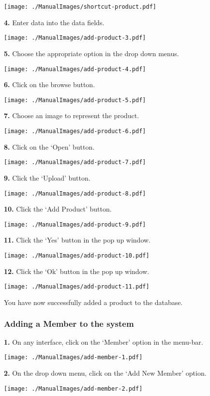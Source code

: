\texttt{[image: ./ManualImages/shortcut-product.pdf]}

\textbf{4. }Enter data into the data fields.

\texttt{[image: ./ManualImages/add-product-3.pdf]}

\textbf{5.} Choose the appropriate option in the drop down menus.

\texttt{[image: ./ManualImages/add-product-4.pdf]}

\textbf{6.} Click on the browse button.

\texttt{[image: ./ManualImages/add-product-5.pdf]}

\textbf{7.} Choose an image to represent the product.

\texttt{[image: ./ManualImages/add-product-6.pdf]}

\textbf{8.} Click on the `Open' button.

\texttt{[image: ./ManualImages/add-product-7.pdf]}

\textbf{9.} Click the `Upload' button.

\texttt{[image: ./ManualImages/add-product-8.pdf]}

\textbf{10.} Click the `Add Product' button.

\texttt{[image: ./ManualImages/add-product-9.pdf]}

\textbf{11.} Click the `Yes' button in the pop up window.

\texttt{[image: ./ManualImages/add-product-10.pdf]}

\textbf{12.} Click the `Ok' button in the pop up window.

\texttt{[image: ./ManualImages/add-product-11.pdf]}

You have now successfully added a product to the database.

\pagebreak
\subsubsection{Adding a Member to the system}
\label{fig:Adding a Member to the system}

\textbf{1.} On any interface, click on the `Member' option in the menu-bar.

\texttt{[image: ./ManualImages/add-member-1.pdf]}

\textbf{2.} On the drop down menu, click on the `Add New Member' option.

\texttt{[image: ./ManualImages/add-member-2.pdf]}

